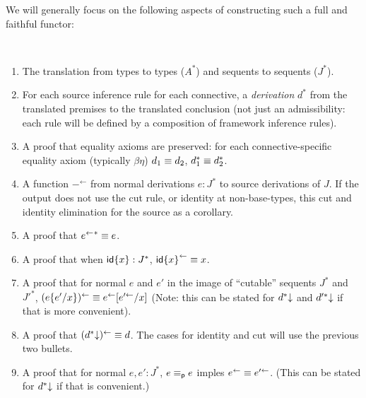 \newcommand\backtrf[1]{\ensuremath{#1^{\leftarrow}}}
\newcommand\backtr[1]{\ensuremath{#1^{\Leftarrow}}}
\newcommand\str[2]{\ensuremath{\dsd{str}_{#1}(#2)}}

We will generally focus on the following aspects of constructing such a
full and faithful functor:
\begin{definition} ~
\begin{enumerate}
\item The translation from types to types ($A^*$) and sequents to
  sequents ($J^*$).

\item For each source inference rule for each connective, a
  \emph{derivation} $d^*$ from the translated premises to the translated
  conclusion (not just an admissibility: each rule will be defined by a
  composition of framework inference rules).

\item A proof that equality axioms are preserved: for each
  connective-specific equality axiom (typically $\beta\eta$) $d_1 \equiv
  d_2$, $d_1^* \equiv d_2^*$.

\item A function \backtrf{-} from normal derivations $e : J^*$ to source
  derivations of $J$.  If the output does not use the cut rule, or
  identity at non-base-types, this cut and identity elimination for the
  source as a corollary.

\item A proof that ${\backtrf{e}}^* \deq e$.  

\item A proof that when ${\mathsf{id}\{x\}} : J^*$, $\backtrf{\Identa{x}} \deq
  x$.

\item A proof that for normal $e$ and $e'$ in the image of ``cutable''
  sequents $J^*$ and $J'^*$, $\backtrf{(\Cuta{e}{e'}{x})} \deq
  \backtrf{e}[\backtrf{e'}/x]$ (Note: this can be stated for $d^*\mathord{\downarrow}$ and
  $d'^*\mathord{\downarrow}$ if that is more convenient).

\item A proof that $\backtrf{(\elim{d^*})} \deq d$.  The cases for
  identity and cut will use the previous two bullets.

\item A proof that for normal $e,e' : J^*$, $e \equiv_{\mathsf{p}} e$ imples
  $\backtrf{e} \deq \backtrf{e'}$.  (This can be stated for
  $d^*\mathord{\downarrow}$ if that is convenient.)
\end{enumerate}
\end{definition}

